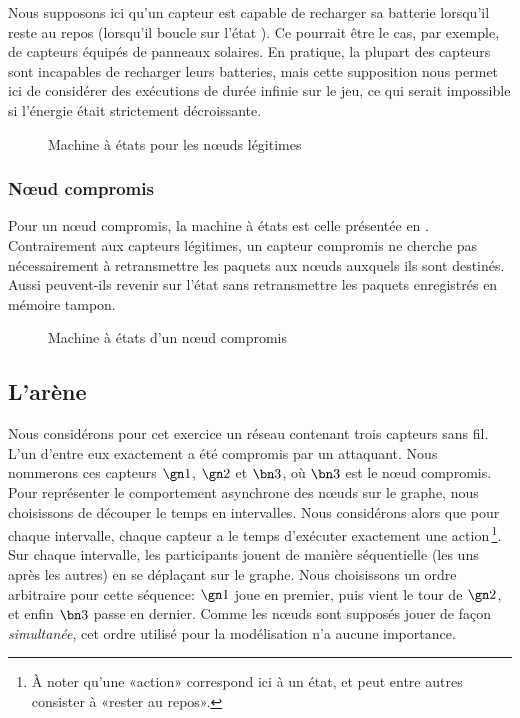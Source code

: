 Nous supposons ici qu'un capteur est capable de recharger sa batterie lorsqu'il reste au repos (\cad lorsqu'il boucle sur l'état \idle).
Ce pourrait être le cas, par exemple, de capteurs équipés de panneaux solaires.
En pratique, la plupart des capteurs sont incapables de recharger leurs batteries, mais cette supposition nous permet ici de considérer des exécutions de durée infinie sur le jeu, ce qui serait impossible si l'énergie était strictement décroissante.
\begin{figure}[H]
    \centering
    
    \caption{Machine à états pour les nœuds légitimes}\label{tj:fig:autGoodNode}
\end{figure}

        \subsubsection{Nœud compromis}
Pour un nœud compromis, la machine à états est celle présentée en .
Contrairement aux capteurs légitimes, un capteur compromis ne cherche pas nécessairement à retransmettre les paquets aux nœuds auxquels ils sont destinés.
Aussi peuvent-ils revenir sur l'état \idle sans retransmettre les paquets enregistrés en mémoire tampon.
\begin{figure}[H]
    \centering
    
    \caption{Machine à états d'un nœud compromis}\label{tj:fig:autBadNode}
\end{figure}

\subsection{L'arène}
Nous considérons pour cet exercice un réseau contenant trois capteurs sans fil.
L'un d'entre eux exactement a été compromis par un attaquant.
Nous nommerons ces capteurs $\gn1$, $\gn2$ et $\bn3$, où $\bn3$ est le nœud compromis.
Pour représenter le comportement asynchrone des nœuds sur le graphe, nous choisissons de découper le temps en intervalles.
Nous considérons alors que pour chaque intervalle, chaque capteur a le temps d'exécuter exactement une action\,\footnote{À noter qu'une «action» correspond ici à un état, et peut entre autres consister à «rester au repos».}.
Sur chaque intervalle, les participants jouent de manière séquentielle (les uns après les autres) en se déplaçant sur le graphe.
Nous choisissons un ordre arbitraire pour cette séquence: $\gn1$ joue en premier, puis vient le tour de $\gn2$, et enfin $\bn3$ passe en dernier.
Comme les nœuds sont supposés jouer de façon \emph{simultanée}, cet ordre utilisé pour la modélisation n'a aucune importance.

